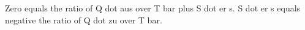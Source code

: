 Zero equals the ratio of Q dot aus over T bar plus S dot er s. S dot er s equals negative the ratio of Q dot zu over T bar.